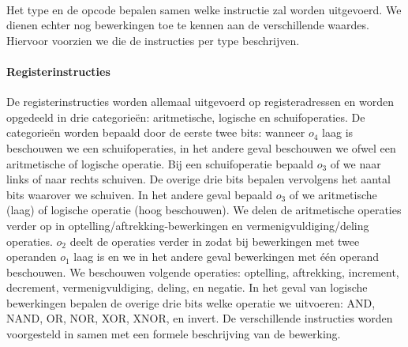 \paragraph{}
Het type en de opcode bepalen samen welke instructie zal worden uitgevoerd. We dienen echter nog bewerkingen toe te kennen aan de verschillende waardes. Hiervoor voorzien we  die de instructies per type beschrijven.
\paragraph{Registerinstructies}
De registerinstructies worden allemaal uitgevoerd op registeradressen en worden opgedeeld in drie categorie\"en: aritmetische, logische en schuifoperaties. De categorie\"en worden bepaald door de eerste twee bits: wanneer $o_4$ laag is beschouwen we een schuifoperaties, in het andere geval beschouwen we ofwel een aritmetische of logische operatie. Bij een schuifoperatie bepaald $o_3$ of we naar links of naar rechts schuiven. De overige drie bits bepalen vervolgens het aantal bits waarover we schuiven. In het andere geval bepaald $o_3$ of we aritmetische (laag) of logische operatie (hoog beschouwen). We delen de aritmetische operaties verder op in optelling/aftrekking-bewerkingen en vermenigvuldiging/deling operaties. $o_2$ deelt de operaties verder in zodat bij bewerkingen met twee operanden $o_1$ laag is en we in het andere geval bewerkingen met \'e\'en operand beschouwen. We beschouwen volgende operaties: optelling, aftrekking, increment, decrement, vermenigvuldiging, deling,  en negatie. In het geval van logische bewerkingen bepalen de overige drie bits welke operatie we uitvoeren: AND, NAND, OR, NOR, XOR, XNOR,  en invert. De verschillende instructies worden voorgesteld in  samen met een formele beschrijving van de bewerking.
